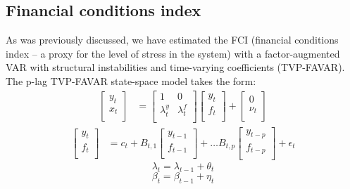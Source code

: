 \subsection{Financial conditions index}
As was previously discussed, we have estimated the FCI (financial conditions index – a proxy for the level of stress in the system) with a factor-augmented VAR with structural instabilities and time-varying coefficients (TVP-FAVAR). The p-lag TVP-FAVAR \citep{koop_2013} state-space model takes the form:
\begin{align}
    \label{eq:tvpfavar_design}
    \begin{bmatrix}
        y_t \\
        x_t \\
    \end{bmatrix} &= 
    \begin{bmatrix}
        1 & 0 \\
        \lambda_t^y & \lambda_t^f \\
    \end{bmatrix}
    \begin{bmatrix}
        y_t \\
        f_t \\
    \end{bmatrix} +
    \begin{bmatrix}
        0 \\
        \nu_t \\
    \end{bmatrix}
\end{align}
\begin{align}
    \label{eq:tvpfavar_transition}
    \begin{bmatrix}
        y_t \\
        f_t \\
    \end{bmatrix} &=
    c_t +
    B_{t,1}
    \begin{bmatrix}
        y_{t-1} \\
        f_{t-1} \\
    \end{bmatrix} + \dots
    B_{t,p}
    \begin{bmatrix}
        y_{t-p} \\
        f_{t-p} \\
    \end{bmatrix} + \epsilon_t
\end{align}
\begin{equation}
    \label{eq:tvpfavar_design_coeff}
    \lambda_t = \lambda_{t-1} + \theta_t
\end{equation}
\begin{equation}
    \label{eq:tvpfavar_transition_coeff}
    \beta_t = \beta_{t-1} + \eta_t
\end{equation}

